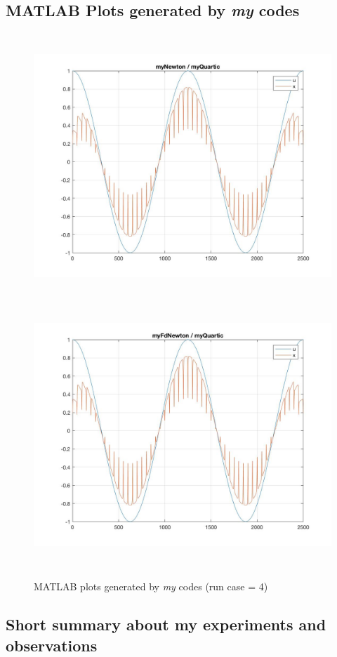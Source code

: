 \subsection{MATLAB Plots generated by \textit{my} codes}
\begin{figure}[H]
\centering
\includegraphics[height=10cm]{p_11}
\includegraphics[height=10cm]{p_12}
\caption{MATLAB plots generated by \textit{my} codes (run case = 4)}
\end{figure}

\subsection{Short summary about my experiments and observations}
